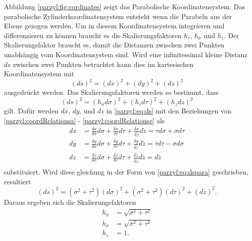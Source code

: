 Abbildung \ref{parzyl:fig:cordinates} zeigt das Parabolische Koordinatensystem.
Das parabolische Zylinderkoordinatensystem entsteht wenn die Parabeln aus der
Ebene gezogen werden. 
Um in diesem Koordinatensystem integrieren und differenzieren zu 
können braucht es die Skalierungsfaktoren $h_{\tau}$, $h_{\sigma}$ und $h_{z}$.
Der Skalierungsfaktor braucht es, damit die Distanzen zwischen zwei 
Punkten unabhängig vom Koordinatensystem sind.
Wird eine infinitessimal kleine Distanz $ds$ zwischen zwei Punkten betrachtet
kann dies im kartesischen Koordinatensystem mit
\begin{equation}
    \left(ds\right)^2 = \left(dx\right)^2 + \left(dy\right)^2 + 
    \left(dz\right)^2
    \label{parzyl:eq:ds}
\end{equation}
ausgedrückt werden.
Das Skalierungsfaktoren werden so bestimmt, dass
\begin{equation}
    \left(ds\right)^2 = \left(h_{\sigma}d\sigma\right)^2 + 
    \left(h_{\tau}d\tau\right)^2 + \left(h_z dz\right)^2
\label{parzyl:eq:dspara}
\end{equation}
gilt.
Dafür werden $dx$, $dy$, und $dz$ in \eqref{parzyl:eq:ds} mit den Beziehungen
von \eqref{parzyl:coordRelationsa} - \eqref{parzyl:coordRelationse} als
\begin{align}
    dx  &= \frac{\delta x }{\delta \sigma} d\sigma + 
        \frac{\delta x }{\delta \tau} d\tau + 
        \frac{\delta x }{\delta \tilde{z}} d \tilde{z} 
        = \tau d\sigma + \sigma d \tau \\
    dy &= \frac{\delta y }{\delta \sigma} d\sigma + 
        \frac{\delta y }{\delta \tau} d\tau +
        \frac{\delta y }{\delta \tilde{z}} d \tilde{z} 
        = \tau d\tau - \sigma d \sigma \\
    dz &= \frac{\delta \tilde{z} }{\delta \sigma} d\sigma + 
        \frac{\delta \tilde{z} }{\delta \tau} d\tau +
        \frac{\delta \tilde{z} }{\delta \tilde{z}} d \tilde{z} 
        = d \tilde{z} \\
\end{align}
substituiert.
Wird diese gleichung in der Form von \eqref{parzyl:eq:dspara}
geschrieben, resultiert
\begin{equation}
    \left(d s\right)^2 = 
        \left(\sigma^2 + \tau^2\right)\left(d\sigma\right)^2 + 
        \left(\sigma^2 + \tau^2\right)\left(d\tau\right)^2 +
        \left(d \tilde{z}\right)^2.
\end{equation}
Daraus ergeben sich die Skalierungsfaktoren 
\begin{align}
    h_{\sigma} &= \sqrt{\sigma^2 + \tau^2}\\
    h_{\sigma} &= \sqrt{\sigma^2 + \tau^2}\\
    h_{z} &= 1.
\end{align}
